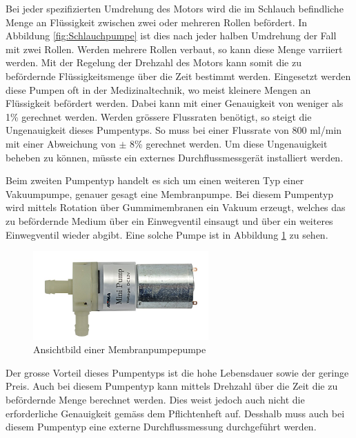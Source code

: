 Bei jeder spezifizierten Umdrehung des Motors wird die im Schlauch befindliche Menge an Flüssigkeit zwischen zwei oder mehreren Rollen befördert. In Abbildung \ref{fig:Schlauchpumpe} ist dies nach jeder halben Umdrehung der Fall mit zwei Rollen. Werden mehrere Rollen verbaut, so kann diese Menge varriiert werden. Mit der Regelung der Drehzahl des Motors kann somit die  zu befördernde Flüssigkeitsmenge über die Zeit bestimmt werden. Eingesetzt werden diese Pumpen oft in der Medizinaltechnik, wo meist kleinere Mengen an Flüssigkeit befördert werden. Dabei kann mit einer Genauigkeit von weniger als 1\% gerechnet werden. Werden grössere Flussraten benötigt, so steigt die Ungenauigkeit dieses Pumpentyps. So muss bei einer Flussrate von 800 ml/min mit einer Abweichung von $\pm$ 8\% gerechnet werden. Um diese Ungenauigkeit beheben zu können, müsste ein externes Durchflussmessgerät installiert werden. \cite{acky69_schlauchpumpe_2018}  

Beim zweiten Pumpentyp handelt es sich um einen weiteren Typ einer Vakuumpumpe, genauer gesagt eine Membranpumpe. Bei diesem Pumpentyp wird mittels Rotation über Gummimembranen ein Vakuum erzeugt, welches das zu befördernde Medium über ein Einwegventil einsaugt und über ein weiteres Einwegventil wieder abgibt. Eine solche Pumpe ist in Abbildung \ref{fig:Membranpumpe} zu sehen. \cite{jens_uber_die_felder_membranpumpe_2019}

\begin{figure}[h!]
	\centering
	\includegraphics[width=0.6\textwidth]{graphics/Membranpumpe.jpg}
	\caption{Ansichtbild einer Membranpumpepumpe \cite{aiyimaindustrial_store_us_nodate}}
	\label{fig:Membranpumpe}
\end{figure}  

Der grosse Vorteil dieses Pumpentyps ist die hohe Lebensdauer sowie der geringe Preis. Auch bei diesem Pumpentyp kann mittels Drehzahl über die Zeit die zu befördernde Menge berechnet werden. Dies weist jedoch auch nicht die erforderliche Genauigkeit gemäss dem Pflichtenheft auf. Desshalb muss auch bei diesem Pumpentyp eine externe Durchflussmessung durchgeführt werden. \cite{jens_uber_die_felder_membranpumpe_2019}\\


